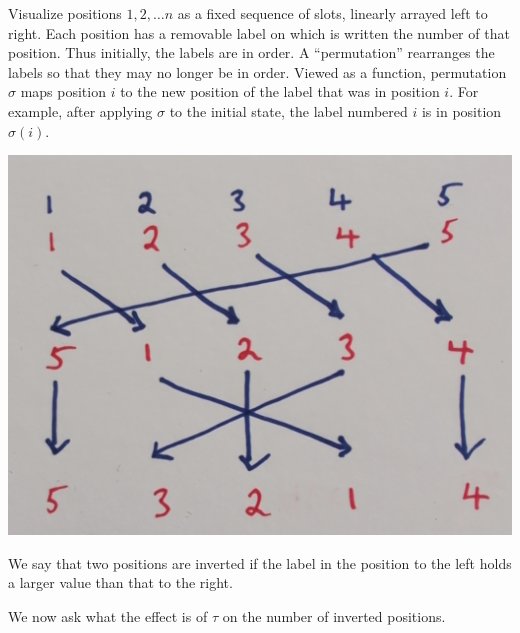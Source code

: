 \begin{intuition}
  Visualize positions $1, 2, \ldots n$ as a fixed sequence of slots, linearly arrayed left to right.
  Each position has a removable label on which is written the number of that position. Thus
  initially, the labels are in order. A ``permutation​'' rearranges the labels so that they may no
  longer be in order. Viewed as a function, permutation $\sigma$ maps position $i$ to the new position
  of the label that was in position $i$. For example, after applying $\sigma$ to the initial state, the
  label numbered $i$ is in position $\sigma(i)$.

  \begin{mdframed}
    \includegraphics[width=400pt]{img/abstract-algebra--nf--2-d7ca.png}
  \end{mdframed}

  We say that two positions are inverted if the label in the position to the left holds a larger
  value than that to the right.


  We now ask what the effect is of $\tau$ on the number of inverted positions.
\end{intuition}

